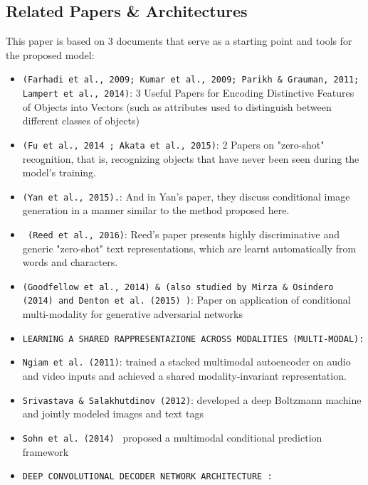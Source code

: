 
\subsection*{Related Papers \& Architectures}
 This paper is based on 3 documents that serve as a starting 
 point and tools for the proposed model:
 
\begin{itemize}[noitemsep]
    \item \texttt{(Farhadi et al., 2009; Kumar et al., 2009;
    Parikh \& Grauman, 2011; Lampert et al., 2014)}: 
    3 Useful Papers for Encoding Distinctive Features of Objects 
    into Vectors (such as attributes used to distinguish 
    between different classes of objects)
    \item \texttt{(Fu et al., 2014 ; Akata et al., 2015)}: 
    2 Papers on "zero-shot" recognition, that is, recognizing 
    objects that have never been seen during the model's training.
    \item \texttt{(Yan et al., 2015).}: 
    And in Yan's paper, they discuss conditional image generation 
    in a manner similar to the method proposed here.
    \item \texttt{ (Reed et al., 2016)}: 
    Reed's paper presents highly discriminative and generic
    "zero-shot" text representations, 
    which are learnt automatically from words and characters.
    \item \texttt{(Goodfellow et al., 2014) \& (also studied
    by Mirza \& Osindero (2014) and Denton et al. (2015) )}: 
    Paper on application of conditional multi-modality for generative adversarial networks 

    \item \texttt{LEARNING A SHARED RAPPRESENTAZIONE ACROSS MODALITIES (MULTI-MODAL):}

    \item \texttt{Ngiam et al. (2011)}: 
    trained a stacked multimodal autoencoder on audio and video inputs and achieved a shared 
    modality-invariant representation.

    \item \texttt{Srivastava \& Salakhutdinov (2012)}: 
    developed a deep Boltzmann machine and jointly modeled images and text tags

    \item \texttt{Sohn et al. (2014) }
    proposed a multimodal conditional prediction framework

    \item \texttt{DEEP CONVOLUTIONAL DECODER NETWORK ARCHITECTURE :}
    

\end{itemize}
